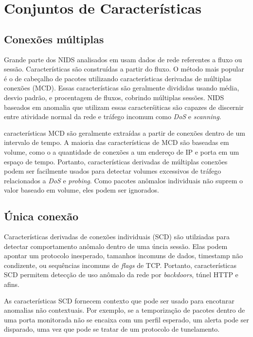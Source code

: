 
\section{Conjuntos de Características}
\subsection{Conexões múltiplas}
Grande parte dos NIDS analisados em \cite{davis11} usam dados de rede referentes a fluxo ou sessão. Características
são construídas a partir do fluxo. O método mais popular é o de cabeçalho de pacotes utilizando características
derivadas de múltiplas conexões (MCD). Essas características são geralmente divididas usando média, desvio padrão, e
procentagem de fluxos, cobrindo múltiplas sessões. NIDS baseados em anomalia que utilizam essas caracterśiticas são
capazes de discernir entre atividade normal da rede e tráfego incomum como \textit{DoS} e \textit{scanning}.
\par características MCD são geralmente extraídas a partir de conexões dentro de um intervalo de tempo. A maioria das
 características de MCD são baseadas em volume, como o a quantidade de conexões a um endereço de IP e porta
 em um espaço de tempo. Portanto, características derivadas de múltiplas conexões podem ser facilmente usados para detectar
 volumes excessivos de tráfego relacionados a \textit{DoS} e \textit{probing}. Como pacotes anômalos individuais não
 suprem o valor baseado em volume, eles podem ser ignorados.

\subsection{Única conexão}
Características derivadas de conexões individuais (SCD) são utilziadas para detectar comportamento anômalo dentro de
uma úncia sessão. Elas podem apontar um protocolo inesperado, tamanhos incomuns de dados, timestamp não condizente,
ou sequências incomuns de \textit{flags} de TCP. Portanto, características SCD permitem detecção de uso anômalo da rede
por \textit{backdoors}, túnel HTTP e afins.
\par As características SCD fornecem contexto que pode ser usado para encotnrar anomalias não contextuais. Por exemplo, se a
temporização de pacotes dentro de uma porta monitorada não se encaixa com um perfil esperado, um alerta pode ser
disparado, uma vez que pode se tratar de um protocolo de tunelamento.

